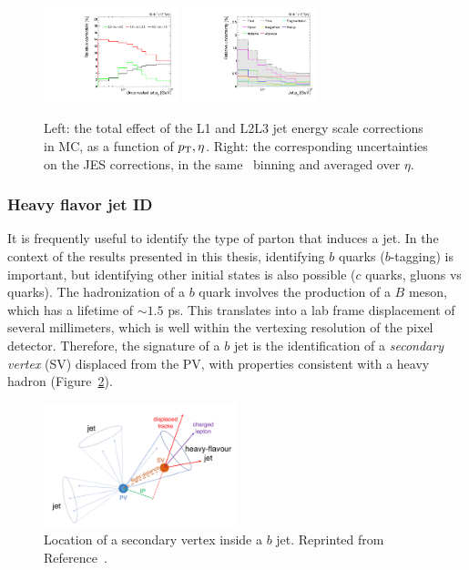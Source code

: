 \begin{figure}[]
\begin{center}
    \includegraphics[width=0.35\textwidth]{figures/cms/jec_jotjotRawPt.pdf}
    \includegraphics[width=0.35\textwidth]{figures/cms/var_jotjotPt.pdf}
    \caption{Left: the total effect of the L1 and L2L3 jet energy scale corrections in MC, as a function of $p_\mathrm{T},\eta$.
             Right: the corresponding uncertainties on the JES corrections, in the same \pt~binning and averaged over $\eta$.}
    \label{fig:cms:jec}
\end{center}
\end{figure}

\subsubsection{Heavy flavor jet ID}

It is frequently useful to identify the type of parton that induces a jet.
In the context of the results presented in this thesis, identifying $b$ quarks ($b$-tagging) is important, but identifying other initial states is also possible ($c$ quarks, gluons vs quarks). 
The hadronization of a $b$ quark involves the production of a $B$ meson, which has a lifetime of $\sim 1.5$ ps. 
This translates into a lab frame displacement of several millimeters, which is well within the vertexing resolution of the pixel detector.
Therefore, the signature of a $b$ jet is the identification of a \emph{secondary vertex} (SV) displaced from the PV, with properties consistent with a heavy hadron (Figure~\ref{fig:cms:bjet}).

\begin{figure}[]
\begin{center}
    \includegraphics[width=0.5\textwidth]{figures/cms/bjet.png}
    \caption{Location of a secondary vertex inside a $b$ jet.
             Reprinted from Reference~\cite{csvv2}.}
    \label{fig:cms:bjet}
\end{center}
\end{figure}


